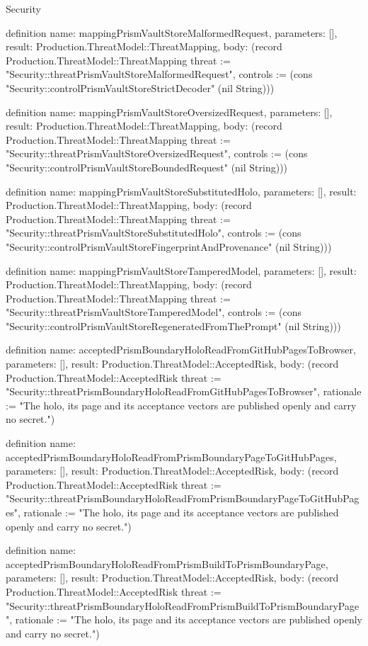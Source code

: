 \begin{lexlean}{Security}
\begin{semanticmodule}
definition{
  name: mappingPrismVaultStoreMalformedRequest,
  parameters: [],
  result: Production.ThreatModel::ThreatMapping,
  body: (record Production.ThreatModel::ThreatMapping {threat := "Security::threatPrismVaultStoreMalformedRequest", controls := (cons "Security::controlPrismVaultStoreStrictDecoder" (nil String))})
}

definition{
  name: mappingPrismVaultStoreOversizedRequest,
  parameters: [],
  result: Production.ThreatModel::ThreatMapping,
  body: (record Production.ThreatModel::ThreatMapping {threat := "Security::threatPrismVaultStoreOversizedRequest", controls := (cons "Security::controlPrismVaultStoreBoundedRequest" (nil String))})
}

definition{
  name: mappingPrismVaultStoreSubstitutedHolo,
  parameters: [],
  result: Production.ThreatModel::ThreatMapping,
  body: (record Production.ThreatModel::ThreatMapping {threat := "Security::threatPrismVaultStoreSubstitutedHolo", controls := (cons "Security::controlPrismVaultStoreFingerprintAndProvenance" (nil String))})
}

definition{
  name: mappingPrismVaultStoreTamperedModel,
  parameters: [],
  result: Production.ThreatModel::ThreatMapping,
  body: (record Production.ThreatModel::ThreatMapping {threat := "Security::threatPrismVaultStoreTamperedModel", controls := (cons "Security::controlPrismVaultStoreRegeneratedFromThePrompt" (nil String))})
}

definition{
  name: acceptedPrismBoundaryHoloReadFromGitHubPagesToBrowser,
  parameters: [],
  result: Production.ThreatModel::AcceptedRisk,
  body: (record Production.ThreatModel::AcceptedRisk {threat := "Security::threatPrismBoundaryHoloReadFromGitHubPagesToBrowser", rationale := "The holo, its page and its acceptance vectors are published openly and carry no secret."})
}

definition{
  name: acceptedPrismBoundaryHoloReadFromPrismBoundaryPageToGitHubPages,
  parameters: [],
  result: Production.ThreatModel::AcceptedRisk,
  body: (record Production.ThreatModel::AcceptedRisk {threat := "Security::threatPrismBoundaryHoloReadFromPrismBoundaryPageToGitHubPages", rationale := "The holo, its page and its acceptance vectors are published openly and carry no secret."})
}

definition{
  name: acceptedPrismBoundaryHoloReadFromPrismBuildToPrismBoundaryPage,
  parameters: [],
  result: Production.ThreatModel::AcceptedRisk,
  body: (record Production.ThreatModel::AcceptedRisk {threat := "Security::threatPrismBoundaryHoloReadFromPrismBuildToPrismBoundaryPage", rationale := "The holo, its page and its acceptance vectors are published openly and carry no secret."})
}


\end{semanticmodule}
\end{lexlean}
